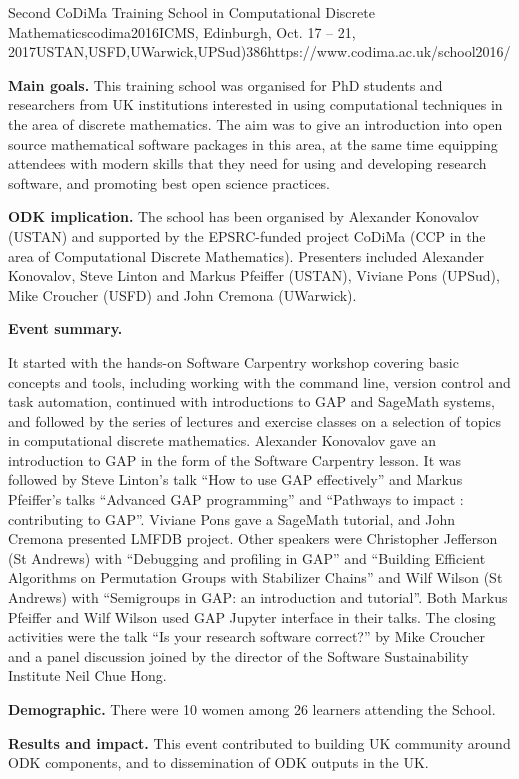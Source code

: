 \begin{event}{Second CoDiMa Training School in Computational Discrete Mathematics}{codima2016}{ICMS, Edinburgh, Oct. 17 -- 21, 2017}{USTAN,USFD,UWarwick,UPSud)}{38}{6}{https://www.codima.ac.uk/school2016/}

\textbf{Main goals.} This training school was organised for PhD students and researchers from
UK institutions interested in using computational techniques in the area of discrete mathematics.
The aim was to give an introduction into open source mathematical software packages in this area,
at the same time equipping attendees with modern skills that they need for using and developing
research software, and promoting best open science practices.

\textbf{ODK implication.} The school has been organised by Alexander Konovalov (USTAN) and supported
by the EPSRC-funded project CoDiMa (CCP in the area of Computational Discrete Mathematics). Presenters
included Alexander Konovalov, Steve Linton and Markus Pfeiffer (USTAN), Viviane Pons (UPSud),
Mike Croucher (USFD) and John Cremona (UWarwick). 

\textbf{Event summary.}

It started with the hands-on Software Carpentry workshop covering basic
concepts and tools, including working with the command line, version control and task automation,
continued with introductions to GAP and SageMath systems, and followed by the series of lectures
and exercise classes on a selection of topics in computational discrete mathematics. Alexander
Konovalov gave an introduction to GAP in the form of the Software Carpentry lesson. It was
followed by Steve Linton's talk ``How to use GAP effectively'' and Markus Pfeiffer's talks
``Advanced GAP programming'' and ``Pathways to impact : contributing to GAP''.
Viviane Pons gave a SageMath tutorial, and John Cremona presented LMFDB project. 
Other speakers were Christopher Jefferson (St Andrews) with 
``Debugging and profiling in GAP'' and 
``Building Efficient Algorithms on Permutation Groups with Stabilizer Chains''
and Wilf Wilson (St Andrews) with ``Semigroups in GAP: an introduction and tutorial''.
Both Markus Pfeiffer and Wilf Wilson used GAP Jupyter interface in their talks.
The closing activities were the talk ``Is your research software correct?'' by Mike Croucher 
and a panel discussion joined by the director of the Software Sustainability Institute Neil Chue Hong.

\textbf{Demographic.} There were 10 women among 26 learners attending the School.

\textbf{Results and impact.} This event contributed to building UK community
around ODK components, and to dissemination of ODK outputs in the UK.

\end{event}